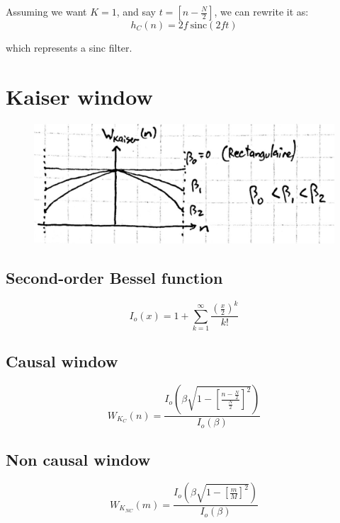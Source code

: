 \documentclass{article}
\begin{document}
Assuming we want $K=1$, and say $t=\left[n-\frac{N}{2}\right]$, we can rewrite it as:
\begin{equation}
    h_C\left(n\right) = 2f ~ \text{sinc} \left(2ft\right)
\end{equation}

which represents a sinc filter.


\section{Kaiser window}
\begin{figure}[!ht]
    \includegraphics{kaiser-window}
\end{figure}
\subsection{Second-order Bessel function}
\begin{equation}
    I_o\left(x\right) = 1+\sum_{k=1}^{\infty}\frac{\left(\frac{x}{2}\right)^k}{k!}
\end{equation}

\subsection{Causal window}
\begin{equation}
    W_{K_{C}}\left(n\right) = \frac{I_o\left(\beta\sqrt{1-\left[\frac{n-\frac{N}{2}}{\frac{N}{2}}\right]^2}\right)}{I_o\left(\beta\right)}
\end{equation}

\subsection{Non causal window}
\begin{equation}
    W_{K_{NC}}\left(m\right) = \frac{I_o\left(\beta\sqrt{1-\left[\frac{m}{M}\right]^2}\right)}{I_o\left(\beta\right)}
\end{equation}
\end{document}
